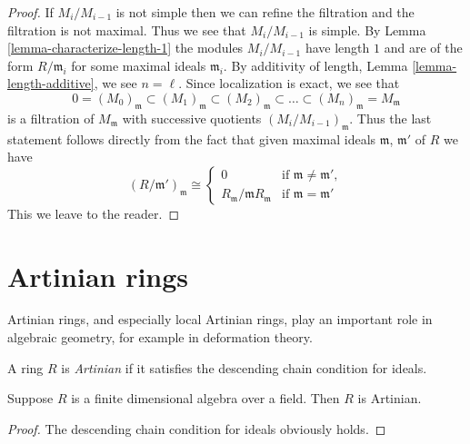 \begin{proof}
If $M_i/M_{i-1}$ is not simple then we can refine the filtration
and the filtration is not maximal. Thus we see that $M_i/M_{i-1}$
is simple. By Lemma \ref{lemma-characterize-length-1} the modules
$M_i/M_{i-1}$ have length $1$ and are of the form $R/\mathfrak m_i$
for some maximal ideals $\mathfrak m_i$. By additivity of length,
Lemma \ref{lemma-length-additive}, we see $n = \ell$. Since localization
is exact, we see that
$$
0 = (M_0)_{\mathfrak m}
\subset (M_1)_{\mathfrak m}
\subset (M_2)_{\mathfrak m}
\subset \ldots
\subset (M_n)_{\mathfrak m} = M_{\mathfrak m}
$$
is a filtration of $M_{\mathfrak m}$ with successive quotients
$(M_i/M_{i-1})_{\mathfrak m}$. Thus the last statement follows
directly from the fact that given maximal ideals $\mathfrak m$,
$\mathfrak m'$ of $R$ we have
$$
(R/\mathfrak m')_{\mathfrak m}
\cong
\left\{
\begin{matrix}
0 &
\text{if } \mathfrak m \not = \mathfrak m', \\
R_{\mathfrak m}/\mathfrak m R_{\mathfrak m} &
\text{if } \mathfrak m  = \mathfrak m'
\end{matrix}
\right.
$$
This we leave to the reader.
\end{proof}














\section{Artinian rings}
\label{section-artinian}

\noindent
Artinian rings, and especially local Artinian rings,
play an important role in algebraic geometry, for example
in deformation theory.

\begin{definition}
\label{definition-artinian}
A ring $R$ is {\it Artinian} if it satisfies the
descending chain condition for ideals.
\end{definition}

\begin{lemma}
\label{lemma-finite-dimensional-algebra}
Suppose $R$ is a finite dimensional algebra over a field.
Then $R$ is Artinian.
\end{lemma}

\begin{proof}
The descending chain condition for ideals obviously holds.
\end{proof}

